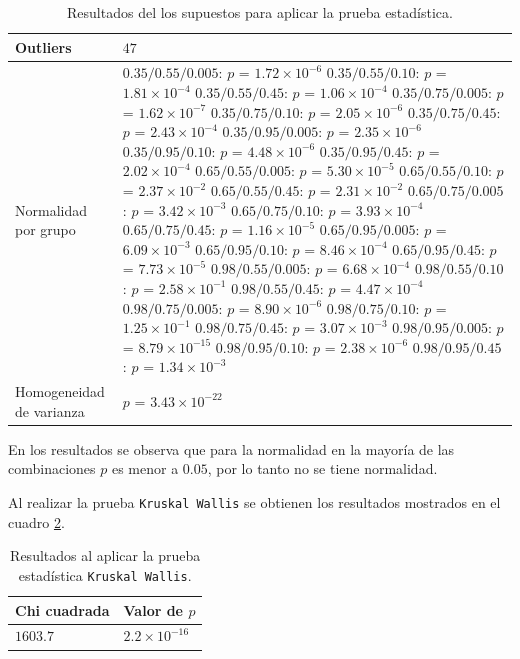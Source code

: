 \documentclass{article}
\begin{document}
\begin{table}[ht]
\centering
\caption{Resultados del los supuestos para aplicar la prueba estadística.}
\smallskip

\begin{tabular}{ |p{2.1cm}|p{5cm}|}
 \hline
 Outliers & $47$ \\
 \hline
 Normalidad por grupo & $0.35/0.55/0.005$: $p$ = $1.72\times 10^{-6}$ $0.35/0.55/0.10$: $p$ = $1.81\times 10^{-4}$ $0.35/0.55/0.45$: $p$ = $1.06\times 10^{-4}$ $0.35/0.75/0.005$: $p$ = $1.62\times 10^{-7}$ $0.35/0.75/0.10$: $p$ = $2.05\times 10^{-6}$ $0.35/0.75/0.45$: $p$ = $2.43\times 10^{-4}$ $0.35/0.95/0.005$: $p$ = $2.35\times 10^{-6}$ $0.35/0.95/0.10$: $p$ = $4.48\times 10^{-6}$ $0.35/0.95/0.45$: $p$ = $2.02\times 10^{-4}$ $0.65/0.55/0.005$: $p$ = $5.30\times 10^{-5}$ $0.65/0.55/0.10$: $p$ = $2.37\times 10^{-2}$ $0.65/0.55/0.45$: $p$ = $2.31\times 10^{-2}$ $0.65/0.75/0.005$: $p$ = $3.42\times 10^{-3}$ $0.65/0.75/0.10$: $p$ = $3.93\times 10^{-4}$ $0.65/0.75/0.45$: $p$ = $1.16\times 10^{-5}$ $0.65/0.95/0.005$: $p$ = $6.09\times 10^{-3}$ $0.65/0.95/0.10$: $p$ = $8.46\times 10^{-4}$ $0.65/0.95/0.45$: $p$ = $7.73\times 10^{-5}$ $0.98/0.55/0.005$: $p$ = $6.68\times 10^{-4}$ $0.98/0.55/0.10$: $p$ = $2.58\times 10^{-1}$ $0.98/0.55/0.45$: $p$ = $4.47\times 10^{-4}$ $0.98/0.75/0.005$: $p$ = $8.90\times 10^{-6}$ $0.98/0.75/0.10$: $p$ = $1.25\times 10^{-1}$ $0.98/0.75/0.45$: $p$ = $3.07\times 10^{-3}$ $0.98/0.95/0.005$: $p$ = $8.79\times 10^{-15}$ $0.98/0.95/0.10$: $p$ = $2.38\times 10^{-6}$ $0.98/0.95/0.45$: $p$ = $1.34\times 10^{-3}$\\
 \hline
 Homogeneidad de varianza & $p$ = $3.43\times 10^{-22}$ \\
 \hline
\end{tabular}
\label{Cuadro1}
\end{table}

\bigskip
En los resultados se observa que para la normalidad en la mayoría de las combinaciones $p$ es menor a $0.05$, por lo tanto no se tiene normalidad.
\bigskip

Al realizar la prueba \texttt{Kruskal Wallis} se obtienen los resultados mostrados en el cuadro \ref{Cuadro2}.

\begin{table}[h!]
\centering
\caption{Resultados al aplicar la prueba estadística \texttt{Kruskal Wallis}.}
\smallskip

\begin{tabular}{ |p{2.1cm}|p{2.1cm}|}
 \hline
 Chi cuadrada & Valor de $p$ \\
 \hline
 $1603.7$ & $2.2\times 10^{-16}$ \\
 \hline
\end{tabular}
\label{Cuadro2}
\end{table}
\end{document}
